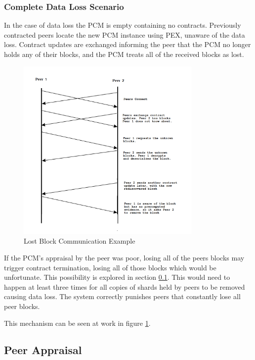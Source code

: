 \documentclass[11pt, a4paper, twoside]{report}
\begin{document}
\subsubsection{Complete Data Loss Scenario}

In the case of data loss the PCM is empty containing no contracts. Previously contracted peers locate the new PCM instance using PEX, unaware of the data loss. Contract updates are exchanged informing the peer that the PCM no longer holds any of their blocks, and the PCM treats all of the received blocks as lost.

\begin{figure}[ht]
 \centering
 \includegraphics[width=0.8\textwidth]{lost-block}
 \caption{Lost Block Communication Example}
 \label{fig:lost-block}
\end{figure}

If the PCM's appraisal by the peer was poor, losing all of the peers blocks may trigger contract termination, losing all of those blocks which would be unfortunate. This possibility is explored in section \ref{sec:peerAppraisal}. This would need to happen at least three times for all copies of shards held by peers to be removed causing data loss. The system correctly punishes peers that constantly lose all peer blocks.

This mechanism can be seen at work in figure \ref{fig:lost-block}.

\subsection{Peer Appraisal} \label{sec:peerAppraisal}
\end{document}
